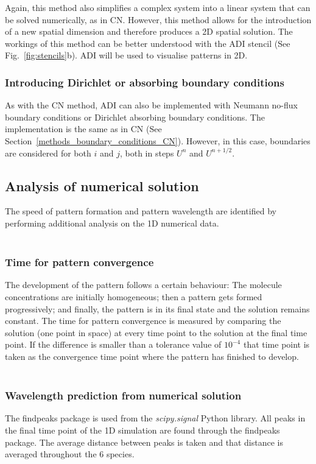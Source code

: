 Again, this method also simplifies a complex system into a linear system that can be solved numerically, as in \acrshort{CN}. However, this method allows for the introduction of a new spatial dimension and therefore produces a 2D spatial solution. The workings of this method can be better understood with the \acrshort{ADI} stencil (See Fig.~\ref{fig:stencils}b). \acrshort{ADI} will be used to visualise patterns in 2D.


\subsubsection{Introducing Dirichlet or absorbing boundary conditions}\label{methods_boundary_conditions_ADI}
As with the CN method, ADI can also be implemented with Neumann no-flux boundary conditions or Dirichlet absorbing boundary conditions.
The implementation is the same as in CN (See Section~\ref{methods_boundary_conditions_CN}).
However, in this case, boundaries are considered for both $i$ and $j$, both in steps $U^n$ and $U^{n+1/2}$.

\subsection{Analysis of numerical solution}
The speed of pattern formation and pattern wavelength are identified by performing additional analysis on the 1D numerical data.  \\\\
\subsubsection{Time for pattern convergence}
The development of the pattern follows a certain behaviour: The molecule concentrations are initially homogeneous; then a pattern gets formed progressively; and finally, the pattern is in its final state and the solution remains constant.
The time for pattern convergence is measured by comparing the solution (one point in space) at every time point to the solution at the final time point. If the difference is smaller than a tolerance value of $10^{-4}$ that time point is taken as the convergence time point where the pattern has finished to develop. \\\\
\subsubsection{Wavelength prediction from numerical solution}
The findpeaks package is used from the \textit{scipy.signal} Python library. All peaks in the final time point of the 1D simulation are found through the findpeaks package. The average distance between peaks is taken and that distance is averaged throughout the 6 species.

